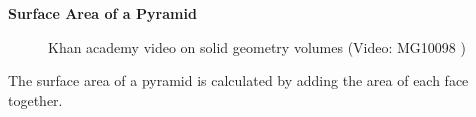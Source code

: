     \addtocounter{footnote}{-0}
    
      \label{m39357*id62647}
        \textbf{Surface Area of a Pyramid}
      \par 
      \label{m39357*eip-485}
    \setcounter{subfigure}{0}


	\begin{figure}[H] %
    
    
    \textnormal{Khan academy video on solid geometry volumes}\vspace{.1in} \nopagebreak
  \label{m39357*yt-media1}\label{m39357*yt-video1}
             { (Video:  MG10098 )}
      
      \vspace{2pt}
    \vspace{.1in}
    
    

 \end{figure}   

    \addtocounter{footnote}{-0}
    \par \label{m39357*id62653}The surface area of a pyramid is calculated by adding the area of each face together.\par 
\label{m39357*secfhsst!!!underscore!!!id97}\vspace{.5cm} 
      
